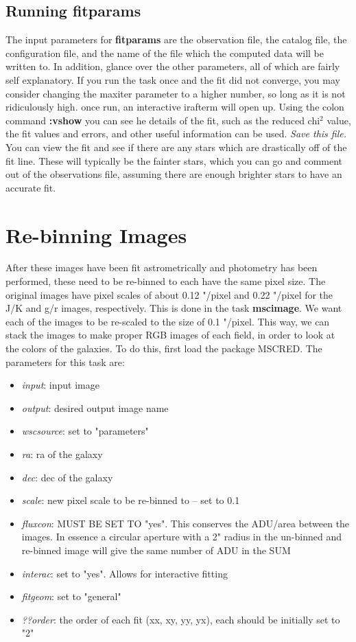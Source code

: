 \documentclass[a4paper]{article}
\begin{document}
\subsection{Running fitparams}
The input parameters for \textbf{fitparams} are the observation file, the catalog file, the configuration file, and the name of the file which the computed data will be written to.  In addition, glance over the other parameters, all of which are fairly self explanatory.  If you run the task once and the fit did not converge, you may consider changing the maxiter parameter to a higher number, so long as it is not ridiculously high.  once run, an interactive irafterm will open up.  Using the colon command \textbf{:vshow} you can see he details of the fit, such as the reduced chi$^{2}$ value, the fit values and errors, and other useful information can be used.  \textit{Save this file.}  You can view the fit and see if there are any stars which are drastically off of the fit line.  These will typically be the fainter stars, which you can go and comment out of the observations file, assuming there are enough brighter stars to have an accurate fit.  


\section{Re-binning Images}
After these images have been fit astrometrically and photometry has been performed, these need to be re-binned to each have the same pixel size.  The original images have pixel scales of about 0.12 "/pixel and 0.22 "/pixel for the J/K and g/r images, respectively.  This is done in the task \textbf{mscimage}.  We want each of the images to be re-scaled to the size of 0.1 "/pixel.  This way, we can stack the images to make proper RGB images of each field, in order to look at the colors of the galaxies.  To do this, first load the package MSCRED.  The parameters for this task are:
\begin{itemize}
    \item \textit{input}: input image
    \item \textit{output}: desired output image name  \\
    \item \textit{wscsource}: set to "parameters"
    \item \textit{ra}: ra of the galaxy
    \item \textit{dec}: dec of the galaxy
    \item \textit{scale}: new pixel scale to be re-binned to -- set to 0.1
    \item \textit{fluxcon}: MUST BE SET TO "yes".  This conserves the ADU/area between the images.  In essence a circular aperture with a 2" radius in the un-binned and re-binned image will give the same number of ADU in the SUM\\
    \item \textit{interac}: set to "yes".  Allows for interactive fitting
    \item \textit{fitgeom}: set to "general"
    \item \textit{??order}: the order of each fit (xx, xy, yy, yx), each should be initially set to "2"
\end{itemize}
\end{document}
